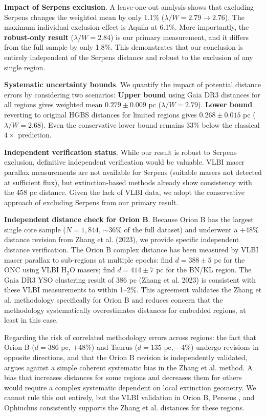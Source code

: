 \documentclass[twocolumn]{mnras}
\begin{document}
\textbf{Impact of Serpens exclusion}. A leave-one-out analysis shows that excluding Serpens changes the weighted mean by only 1.1\% ($\lambda/W = 2.79 \to 2.76$). The maximum individual exclusion effect is Aquila at 6.1\%. More importantly, the \textbf{robust-only result} ($\lambda/W = 2.84$) is our primary measurement, and it differs from the full sample by only 1.8\%. This demonstrates that our conclusion is entirely independent of the Serpens distance and robust to the exclusion of any single region.

\textbf{Systematic uncertainty bounds}. We quantify the impact of potential distance errors by considering two scenarios: \textbf{Upper bound} using Gaia DR3 distances for all regions gives weighted mean $0.279 \pm 0.009$ pc ($\lambda/W = 2.79$). \textbf{Lower bound} reverting to original HGBS distances for limited regions gives $0.268 \pm 0.015$ pc ($\lambda/W = 2.68$). Even the conservative lower bound remains 33\% below the classical $4\times$ prediction.

\textbf{Independent verification status}. While our result is robust to Serpens exclusion, definitive independent verification would be valuable. VLBI maser parallax measurements are not available for Serpens (suitable masers not detected at sufficient flux), but extinction-based methods already show consistency with the 458 pc distance. Given the lack of VLBI data, we adopt the conservative approach of excluding Serpens from our primary result.

\textbf{Independent distance check for Orion B}. Because Orion B has the largest single core sample ($N = 1,844$, $\sim$36\% of the full dataset) and underwent a $+$48\% distance revision from Zhang et al. (2023), we provide specific independent distance verification. The Orion B complex distance has been measured by VLBI maser parallax to sub-regions at multiple epochs: \citet{Kounkel2017} find $d = 388 \pm 5$ pc for the ONC using VLBI H$_2$O masers; \citet{Menten2007} find $d = 414 \pm 7$ pc for the BN/KL region. The Gaia DR3 YSO clustering result of 386 pc (Zhang et al. 2023) is consistent with these VLBI measurements to within 1--2\%. This agreement validates the Zhang et al. methodology specifically for Orion B and reduces concern that the methodology systematically overestimates distances for embedded regions, at least in this case.

Regarding the risk of correlated methodology errors across regions: the fact that Orion B ($d = 386$ pc, $+$48\%) and Taurus ($d = 135$ pc, $-$4\%) undergo revisions in opposite directions, and that the Orion B revision is independently validated, argues against a simple coherent systematic bias in the Zhang et al. method. A bias that increases distances for some regions and decreases them for others would require a complex systematic dependent on local extinction geometry. We cannot rule this out entirely, but the VLBI validation in Orion B, Perseus \citep{OrtizLeon2018}, and Ophiuchus \citep{OrtizLeon2017} consistently supports the Zhang et al. distances for these regions.
\end{document}
